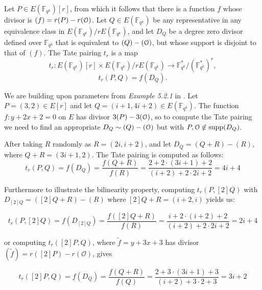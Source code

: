 \begin{definition}
	Let $P \in E(\mathbb{F}_{q^k})[r]$, from which it follows that there is a function $f$ whose divisor is $(f) = r(P) - r(\EuScript{O})$. Let $Q \in E(\mathbb{F}_{q^k})$ be any representative in any equivalence class in $E(\mathbb{F}_{q^k})/rE(\mathbb{F}_{q^k})$, and let $D_Q$ be a degree zero divisor defined over $\mathbb{F}_{q^k}$ that is equivalent to $(Q) - (\EuScript{O})$, but whose support is disjoint to that of $(f)$. The Tate pairing $t_r$ is a map
	\[
	t_r : E(\mathbb{F}_{q^k})[r] \times E(\mathbb{F}_{q^k})/rE(\mathbb{F}_{q^k}) \rightarrow \mathbb{F}^*_{q^k}/(\mathbb{F}^*_{q^k})^r,
	\]
	\[
	t_r(P, Q) = f(D_Q).
	\]
	\label{def:tatepairingoverfinitefields}
\end{definition}



\begin{example}
	
	
	We are building upon parameters from \textit{Example 5.2.1} in \cite{theory.pairings.for.beginners}. Let $P = (3, 2) \in E[r]$ and let $Q = (i + 1, 4i + 2) \in E(\mathbb{F}_{q^k})$. The function $f : y + 2x + 2 = 0$ on $E$ has divisor $3(P) - 3(\EuScript{O})$, so to compute the Tate pairing we need to find an appropriate $D_Q \sim (Q) - (\EuScript{O})$ but with $P, \EuScript{O} \notin \text{supp}(D_Q)$. 
	
	After taking $R$ randomly as $R = (2i, i + 2)$, and let $D_Q = (Q + R) - (R)$, where $Q + R = (3i + 1, 2)$. The Tate pairing is computed as follows:	
	\[
		t_r(P,Q) = f(D_Q) = \dfrac{f(Q+R)}{f(R)} = \dfrac{2+2\cdot (3i+1) +2}{ (i+2)+2 \cdot 2i +2} = 4i+4
	\]
	
	Furthermore to illustrate the bilinearity property, computing $t_r(P, [2]Q)$ with $D_{[2]Q} = ([2]Q + R) - (R)$ where $[2]Q + R = (i + 2, i)$ yields us:
	
	\[
		t_r(P, [2]Q)	 = f(D_{[2]Q}) = \frac{ f([2]Q + R) }{f(R)} = \dfrac{i+2 \cdot (i+2)+2}{(i+2) +2 \cdot 2i +2} = 2i +4
	\]
	
	or computing $t_r([2]P, Q)$, where $\tilde{f} = y + 3x + 3$ has divisor $(\tilde{f}) = r([2]P) - r(\mathcal{O})$, gives
	
	\[
		t_r([2]P,Q) = f(D_Q) = \dfrac{f(Q+R)}{f(Q)} = \dfrac{2 + 3 \cdot (3i +1) +3}{(i+2) + 3 \cdot2+3} = 3i+2
	\]
	
	\label{ex:ch3.tatealap}
\end{example}


